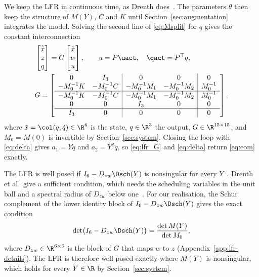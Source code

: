 We keep the LFR in continuous time, as Drenth does~\cite[Sec.~2.1]{drenth2025thesis}.
The parameters $\theta$ then keep the structure of $M(Y)$, $C$ and $K$ until
Section~\ref{sec:augmentation} integrates the model.
Solving the second line of \eqref{eq:Msplit} for $\ddot q$ gives the constant
interconnection
{\footnotesize
\setlength{\arraycolsep}{2.5pt}
\begin{equation}
\begin{aligned}
  &\begin{bmatrix}\dot{\tilde x}\\ z\\ q\end{bmatrix}
  =G\begin{bmatrix}\tilde x\\ w\\ u\end{bmatrix},
  \qquad u=P\uact,\quad \qact=P^\top q,\\
  &G=\left[\begin{array}{cc|cc|c}
  0&I_3&0&0&0\\
  -M_0^{-1}K&-M_0^{-1}C&-M_0^{-1}M_1&-M_0^{-1}M_2&M_0^{-1}\\\hline
  -M_0^{-1}K&-M_0^{-1}C&-M_0^{-1}M_1&-M_0^{-1}M_2&M_0^{-1}\\
  0&0&I_3&0&0\\\hline
  I_3&0&0&0&0
  \end{array}\right],
\end{aligned}
  \label{eq:lfr_G}
\end{equation}
}
where $\tilde x=\col(q,\dot q)\in\R^6$ is the state, $q\in\R^3$ the output,
$G\in\R^{15\times15}$, and $M_0=M(0)$ is invertible by
Section~\ref{sec:system}.
Closing the loop with \eqref{eq:delta} gives $a_1=Y\ddot q$ and
$a_2=Y^2\ddot q$, so \eqref{eq:lfr_G} and \eqref{eq:delta} return
\eqref{eq:eom} exactly.

The LFR is well posed if $I_6-D_{zw}\Dsch(Y)$ is nonsingular for every
$Y$~\cite[Sec.~2.1]{drenth2025thesis}.
Drenth et al.\ give a sufficient condition, which needs the
scheduling variables in the unit ball and a spectral radius of $D_{zw}$ below
one~\cite[Thm.~6]{drenth2025lpvlfr}.
For our realisation, the Schur complement of the lower identity block of
$I_6-D_{zw}\Dsch(Y)$ gives the exact condition
\begin{equation}
  \det\bigl(I_6-D_{zw}\Dsch(Y)\bigr)=\frac{\det M(Y)}{\det M_0},
  \label{eq:wellposed}
\end{equation}
where $D_{zw}\in\R^{6\times6}$ is the block of $G$ that maps $w$ to $z$
(Appendix~\ref{app:lfr-details}).
The LFR is therefore well posed exactly where $M(Y)$ is nonsingular, which
holds for every $Y\in\R$ by Section~\ref{sec:system}.

